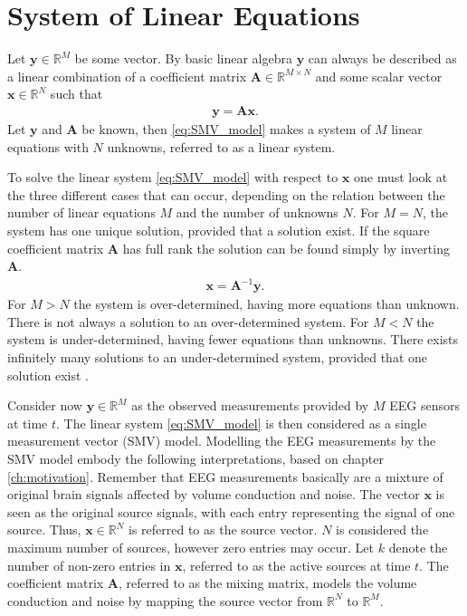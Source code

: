 \section{System of Linear Equations}\label{sec:SMV}
Let $\mathbf{y} \in \mathbb{R}^M$ be some vector. By basic linear algebra $\mathbf{y}$ can always be described as a linear combination of a coefficient matrix $\mathbf{A} \in \mathbb{R}^{M \times N}$ and some scalar vector $\mathbf{x} \in \mathbb{R}^N$ such that
\begin{align}\label{eq:SMV_model}
\mathbf{y} = \mathbf{Ax}.
\end{align}
Let $\mathbf{y}$ and $\mathbf{A}$ be known, then  
\ref{eq:SMV_model} makes a system of $M$ linear equations with $N$ unknowns, referred to as a linear system. 

To solve the linear system \ref{eq:SMV_model} with respect to $\textbf{x}$ one must look at the three different cases that can occur, depending on the relation between the number of linear equations $M$ and the number of unknowns $N$.
For $M = N$, the system has one unique solution, provided that a solution exist.  
If the square coefficient matrix $\mathbf{A}$ has full rank the solution can be found simply by inverting $\mathbf{A}$.
\begin{align*}
\mathbf{x} = \mathbf{A}^{-1} \mathbf{y}.
\end{align*}
For $M > N$ the system is over-determined, having more equations than unknown. There is not always a solution to an over-determined system.   
For $M < N$ the system is under-determined, having fewer equations than unknowns. There exists infinitely many solutions to an under-determined system, provided that one solution exist \cite[p. ix]{CS}.  

Consider now $\mathbf{y} \in \mathbb{R}^M$ as the observed measurements provided by $M$ EEG sensors at time $t$. 
The linear system \ref{eq:SMV_model} is then considered as a single measurement vector (SMV) model.  
Modelling the EEG measurements by the SMV model embody the following interpretations, based on chapter \ref{ch:motivation}.
Remember that EEG measurements basically are a mixture of original brain signals affected by volume conduction and noise.
The vector $\mathbf{x}$ is seen as the original source signals, with each entry representing the signal of one source. 
Thus, $\mathbf{x} \in \mathbb{R}^N$ is referred to as the source vector. 
$N$ is considered the maximum number of sources, however zero entries may occur. 
Let $k$ denote the number of non-zero entries in $\mathbf{x}$, referred to as the active sources at time $t$.   
The coefficient matrix $\mathbf{A}$, referred to as the mixing matrix, models the volume conduction and noise by mapping the source vector from $\mathbb{R}^N$ to $\mathbb{R}^M$.            

